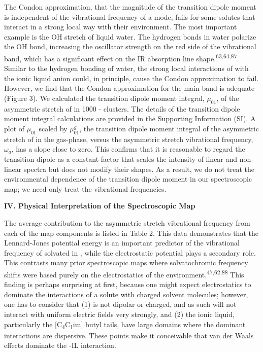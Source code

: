 \documentclass[]{article}
\begin{document}
The Condon approximation, that the magnitude of the transition dipole moment is independent of the vibrational frequency of a mode, fails for some solutes that interact in a strong local way with their environment.  The most important example is the OH stretch of liquid water. The hydrogen bonds in water polarize the OH bond, increasing the oscillator strength on the red side of the vibrational band, which has a significant effect on the IR absorption line shape.\textsuperscript{63,64,87} Similar to the hydrogen bonding of water, the strong local interactions of  with the ionic liquid anion could, in principle, cause the Condon approximation to fail. However, we find that the Condon approximation for the main band is adequate (Figure 3). We calculated the transition dipole moment integral, \(\mu_{01}\), of the asymmetric stretch of  in 1000 -\ce{[C4C1im][PF6]} clusters. The details of the transition dipole moment integral calculations are provided in the Supporting Information (SI). A plot of \(\mu_{01}\) scaled by \(\mu_{01}^{g}\), the transition dipole moment integral of the asymmetric stretch of  in the gas-phase, versus the asymmetric stretch vibrational frequency, \(\omega_{a}\), has a slope close to zero. This confirms that it is reasonable to regard the transition dipole as a constant factor that scales the intensity of linear and non-linear spectra but does not modify their shapes. As a result, we do not treat the environmental dependence of the transition dipole moment in our spectroscopic map; we need only treat the vibrational frequencies.

\textbf{IV. Physical Interpretation of the Spectroscopic Map}

The average contribution to the  asymmetric stretch vibrational frequency from each of the map components is listed in Table 2. This data demonstrates that the Lennard-Jones potential energy is an important predictor of the vibrational frequency of  solvated in \ce{[C4C1im][PF6]}, while the electrostatic potential plays a secondary role. This contrasts many prior spectroscopic maps where solvatochromic frequency shifts were based purely on the electrostatics of the environment.\textsuperscript{47,62,88} This finding is perhaps surprising at first, because one might expect electrostatics to dominate the interactions of a solute with charged solvent molecules; however, one has to consider that (1)  is not dipolar or charged, and as such will not interact with uniform electric fields very strongly, and (2) the ionic liquid, particularly the {[}C\textsubscript{4}C\textsubscript{1}im{]} butyl tails, have large domains where the dominant interactions are dispersive. These points make it conceivable that van der Waals effects dominate the -IL interaction.
\end{document}
